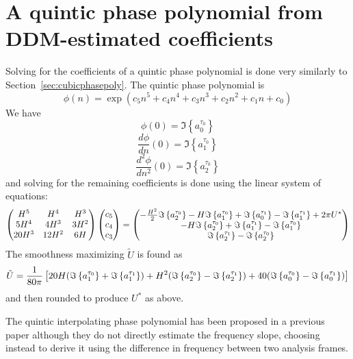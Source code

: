 \section{A quintic phase polynomial from DDM-estimated coefficients\label{sec:quinticphasepoly}}

Solving for the coefficients of a quintic phase polynomial is done very
similarly to Section~\ref{sec:cubicphasepoly}. The quintic phase polynomial is
\begin{equation}
    \label{eq:quinticphasepoly}
    \phi(n) = \exp \left(c_5 n^{5} + c_4 n^{4} + c_3 n^{3} + c_2 n^{2} + c_1 n + c_0 \right)
\end{equation}
We have
\[
    \phi(0) = \Im \left\{ a^{\tau_0}_0 \right\}
\]
\[
    \frac{d \phi}{d n}(0) = \Im \left\{ a^{\tau_0}_1 \right\}
\]
\[
    \frac{d^{2} \phi}{d n^{2}}(0) = \Im \left\{ a^{\tau_0}_2 \right\}
\]
and solving for the remaining coefficients is done using the linear system of
equations:
\begin{equation}
    \begin{pmatrix}
        H^5 & H^4 & H^3 \\
        5 H^4 & 4 H^3 & 3 H^2 \\
        20 H^3 & 12 H^2 & 6 H
    \end{pmatrix}
    \begin{pmatrix}
        c_5 \\
        c_4 \\
        c_3
    \end{pmatrix}
    =
    \begin{pmatrix}
        -\frac{ H^{2} }{2} \Im \left\{  a^{\tau_0}_2  \right\} - H \Im \left\{  a^{\tau_0}_1  \right\} +
            \Im \left\{  a^{\tau_1}_0  \right\} - \Im \left\{  a^{\tau_1}_1  \right\} + 2 \pi U^{\ast}\\
        -H \Im \left\{  a^{\tau_0}_2  \right\} + \Im \left\{  a^{\tau_1}_1  \right\} - \Im \left\{  a^{\tau_0}_1  \right\} \\
        \Im \left\{  a^{\tau_1}_2  \right\} - \Im \left\{  a^{\tau_0}_2  \right\}
    \end{pmatrix}
\end{equation}
The smoothness maximizing $\tilde{U}$ is found as
\[
    \tilde{U} = \frac{1}{80 \pi} \left[ 20 H ( \Im \left\{  a^{\tau_0}_1  \right\} + \Im \left\{  a^{\tau_1}_1  \right\} )
        + H^2 ( \Im \left\{  a^{\tau_0}_2  \right\} - \Im \left\{  a^{\tau_1}_2  \right\} )
        + 40 ( \Im \left\{  a^{\tau_0}_0  \right\} - \Im \left\{  a^{\tau_1}_0  \right\} ) \right]
\]
and then rounded to produce $U^{\ast}$ as above.

The quintic interpolating phase polynomial has been proposed in a previous paper
\cite{girin2003comparing} although they do not directly estimate the frequency
slope, choosing instead to derive it using the difference in frequency between
two analysis frames.

